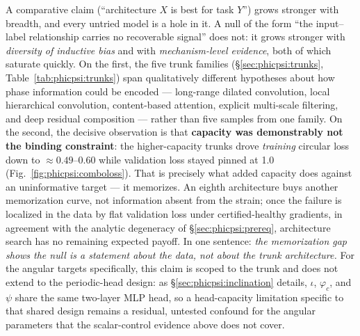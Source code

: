 A comparative claim (``architecture $X$ is best for task $Y$'') grows stronger with breadth, and every untried model is a hole in it.
A null of the form ``the input--label relationship carries no recoverable signal'' does not: it grows stronger with \emph{diversity of inductive bias} and with \emph{mechanism-level evidence}, both of which saturate quickly.
On the first, the five trunk families (\S\ref{sec:phicpsi:trunks}, Table~\ref{tab:phicpsi:trunks}) span qualitatively different hypotheses about how phase information could be encoded --- long-range dilated convolution, local hierarchical convolution, content-based attention, explicit multi-scale filtering, and deep residual composition --- rather than five samples from one family.
On the second, the decisive observation is that \textbf{capacity was demonstrably not the binding constraint}: the higher-capacity trunks drove \emph{training} circular loss down to ${\approx}0.49$--$0.60$ while validation loss stayed pinned at 1.0 (Fig.~\ref{fig:phicpsi:comboloss}).
That is precisely what added capacity does against an uninformative target --- it memorizes.
An eighth architecture buys another memorization curve, not information absent from the strain; once the failure is localized in the data by flat validation loss under certified-healthy gradients, in agreement with the analytic degeneracy of \S\ref{sec:phicpsi:prereq}, architecture search has no remaining expected payoff.
In one sentence: \emph{the memorization gap shows the null is a statement about the data, not about the trunk architecture.}
For the angular targets specifically, this claim is scoped to the trunk and does not extend to the periodic-head design: as \S\ref{sec:phicpsi:inclination} details, $\iota$, $\varphi_c$, and $\psi$ share the same two-layer MLP head, so a head-capacity limitation specific to that shared design remains a residual, untested confound for the angular parameters that the scalar-control evidence above does not cover.

